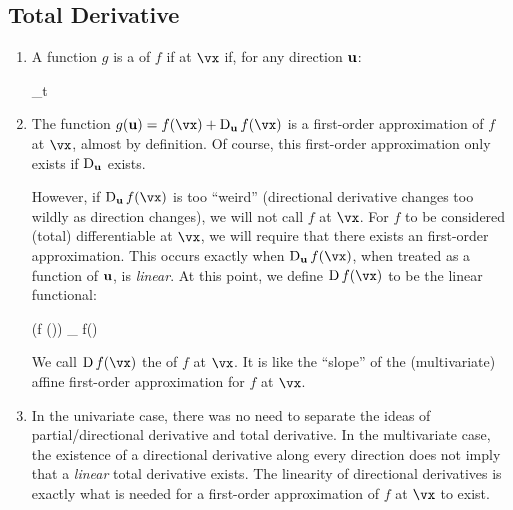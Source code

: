 \documentclass[11pt, oneside]{amsart}
\newcommand{\opD}{\operatorname{D}}
\begin{document}
\subsection{Total Derivative}
\begin{enumerate}
\item A function $g$ is a  of $f$ if
at $\vx$ if, for any direction $\bm{\mathrm{u}}$:

\begin{nedqn}
  \lim_{t }
\end{nedqn}

\item The function $g(\vu) = f(\vx) + \opD_{\vu} f(\vx)$ is a
first-order approximation of $f$ at $\vx$, almost by definition. Of
course, this first-order approximation only exists if $\opD_{\vu}$
exists.

However, if $\opD_{\vu} f(\vx)$ is too ``weird'' (directional derivative
changes too wildly as direction changes), we will not call $f$
 at $\vx$. For $f$ to be considered
(total) differentiable at $\vx$, we will require that there exists an
 first-order approximation. This occurs exactly when
$\opD_{\vu} f(\vx)$, when treated as a function of $\bm{\mathrm{u}}$, is
\emph{linear}. At this point, we define $\opD f(\vx)$ to be the linear
functional:

\begin{nedqn}
  \left(\opD f (\vx)\right) \vu
{}
  \opD_{\vu} f(\vx)
\end{nedqn}

\noindent
We call $\opD f(\vx)$ the  of $f$ at $\vx$.
It is like the ``slope'' of the (multivariate) affine first-order
approximation for $f$ at $\vx$.

\item In the univariate case, there was no need to separate the ideas of
partial/directional derivative and total derivative. In the multivariate
case, the existence of a directional derivative along every direction
does not imply that a \emph{linear} total derivative exists. The
linearity of directional derivatives is exactly what is needed
for a first-order approximation of $f$ at $\vx$ to exist.
\end{enumerate}
\end{document}
